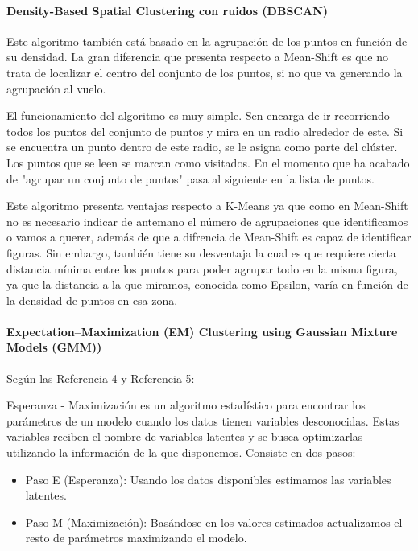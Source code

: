 \documentclass[conference,a4paper]{IEEEtran}
\begin{document}
\paragraph{\textbf{Density-Based Spatial Clustering con ruidos (DBSCAN)}}

Este algoritmo también está basado en la agrupación de los puntos en función de su densidad. La gran diferencia que presenta respecto a Mean-Shift es que no trata de localizar el centro del conjunto de los puntos, si no que va generando la agrupación al vuelo.

El funcionamiento del algoritmo es muy simple. Sen encarga de ir recorriendo todos los puntos del conjunto de puntos y mira en un radio alrededor de este. Si se encuentra un punto dentro de este radio, se le asigna como parte del clúster. Los puntos que se leen se marcan como visitados. En el momento que ha acabado de "agrupar un conjunto de puntos" pasa al siguiente en la lista de puntos.

Este algoritmo presenta ventajas respecto a K-Means ya que como en Mean-Shift no es necesario indicar de antemano el número de agrupaciones que identificamos o vamos a querer, además de que a difrencia de Mean-Shift es capaz de identificar figuras. Sin embargo, también tiene su desventaja la cual es que requiere cierta distancia mínima entre los puntos para poder agrupar todo en la misma figura, ya que la distancia a la que miramos, conocida como Epsilon, varía en función de la densidad de puntos en esa zona.\\

\paragraph{\textbf{Expectation–Maximization (EM) Clustering using Gaussian Mixture Models (GMM))}}

Según las  \hyperref[bib:EM-GMM1]{Referencia 4} y \hyperref[bib:EM-GMM2]{Referencia 5}:

Esperanza - Maximización es un algoritmo estadístico para encontrar los parámetros de un modelo cuando los datos tienen variables desconocidas. Estas variables reciben el nombre de variables latentes y se busca optimizarlas utilizando la información de la que disponemos. Consiste en dos pasos:
\begin{itemize}
	\item Paso E (Esperanza): Usando los datos disponibles estimamos las variables latentes.\\
	\item Paso M (Maximización): Basándose en los valores estimados actualizamos el resto de parámetros maximizando el modelo.
\end{itemize}
\end{document}
